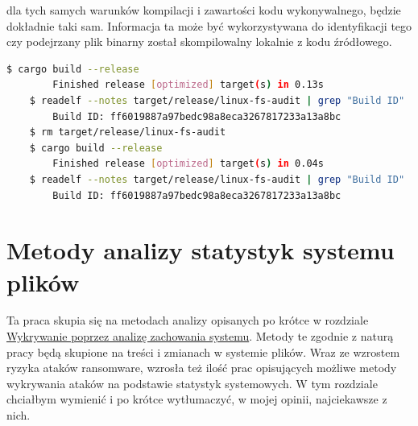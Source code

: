 dla tych samych warunków kompilacji i zawartości kodu wykonywalnego, będzie dokładnie taki sam. Informacja ta może być wykorzystywana do
identyfikacji tego czy podejrzany plik binarny został skompilowalny lokalnie z kodu źródłowego.
\newpage
\begin{lstlisting}[language=bash,
    backgroundcolor=\color{EEGold!5!white},
    caption={Test rekompilacji aplikacji napisanej w języku Rust. Mimo ponownej kompilacji, przy braku zmiany kodu źródłowego, identyfikator pozostał ten sam.
    Można więc z dużą pewnością stwierdzić, że plik wykonywalny był skompilowalny na tej maszynie, a nie pobrany z internetu.},
    label={lst:helloC}]
    $ cargo build --release
        Finished release [optimized] target(s) in 0.13s
    $ readelf --notes target/release/linux-fs-audit | grep "Build ID"
        Build ID: ff6019887a97bedc98a8eca3267817233a13a8bc
    $ rm target/release/linux-fs-audit
    $ cargo build --release
        Finished release [optimized] target(s) in 0.04s
    $ readelf --notes target/release/linux-fs-audit | grep "Build ID"
        Build ID: ff6019887a97bedc98a8eca3267817233a13a8bc
\end{lstlisting}
\section{Metody analizy statystyk systemu plików}
Ta praca skupia się na metodach analizy opisanych po krótce w rozdziale \hyperref[sec:behav]{Wykrywanie poprzez analizę zachowania systemu}.
Metody te zgodnie z naturą pracy będą skupione na treści i zmianach w systemie plików. 
Wraz ze wzrostem ryzyka ataków ransomware, wzrosła też ilość prac opisujących możliwe metody wykrywania ataków
na podstawie statystyk systemowych. W tym rozdziale chciałbym wymienić i po krótce wytłumaczyć, w mojej opinii, najciekawsze z nich.
